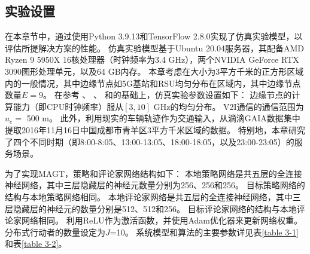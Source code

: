\subsection{实验设置}

在本章节中，通过使用Python 3.9.13和TensorFlow 2.8.0实现了仿真实验模型，以评估所提解决方案的性能。
仿真实验模型基于Ubuntu 20.04服务器，其配备AMD Ryzen 9 5950X 16核处理器（时钟频率为3.4 GHz），两个NVIDIA GeForce RTX 3090图形处理单元，以及64 GB内存。
本章考虑在大小为3平方千米的正方形区域内的一般情况，其中边缘节点如5G基站和RSU均匀分布在区域内，其中边缘节点数量$E=9$。
在参考 、 、 和的基础上，仿真实验参数设置如下：
边缘节点的计算能力（即CPU时钟频率）服从$[3, 10]$ GHz的均匀分布\cite{zhou2019computation}。 
V2I通信的通信范围为$u_e =$ 500 m\cite{zhu2021decentralized}。
此外，利用现实的车辆轨迹作为交通输入，从滴滴GAIA数据集中提取2016年11月16日中国成都市青羊区3平方千米区域的数据。
特别地，本章研究了四个不同时期（即8:00-8:05、13:00-13:05、18:00-18:05，以及23:00-23:05）的服务场景。

为了实现MAGT，策略和评论家网络结构如下：
本地策略网络是共五层的全连接神经网络，其中三层隐藏层的神经元数量分别为256、256和256。
目标策略网络的结构与本地策略网络相同。
本地评论家网络是共五层的全连接神经网络，其中三层隐藏层的神经元的数量分别是512、512和256。
目标评论家网络的结构与本地评论家网络相同。
利用ReLU作为激活函数，并使用Adam优化器来更新网络权重。
分布式行动者的数量设定为$J$=10。
系统模型和算法的主要参数详见表\ref{table 3-1}和表\ref{table 3-2}。

\begin{table}[h]\small
\centering
{}
\label{table 3-1}
\end{table}

